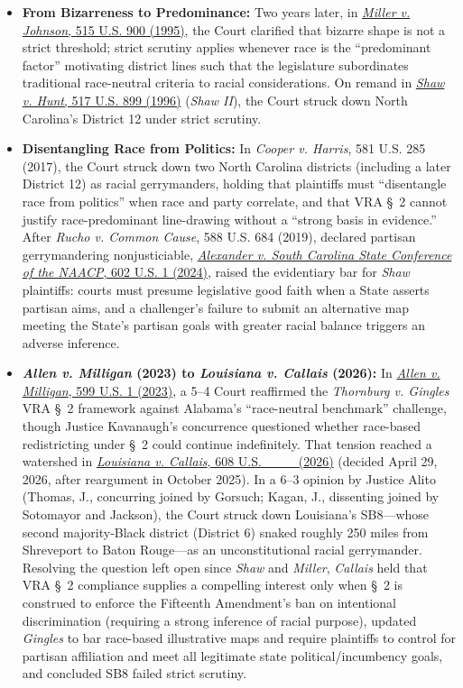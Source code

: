 \documentclass[12pt]{article}
\begin{document}
\begin{itemize}
  \item \textbf{From Bizarreness to Predominance:} Two years later, in \href{https://supreme.justia.com/cases/federal/us/515/900/}{\textit{Miller v. Johnson}, 515 U.S. 900 (1995)}, the Court clarified that bizarre shape is not a strict threshold; strict scrutiny applies whenever race is the ``predominant factor'' motivating district lines such that the legislature subordinates traditional race-neutral criteria to racial considerations. On remand in \href{https://supreme.justia.com/cases/federal/us/517/899/}{\textit{Shaw v. Hunt}, 517 U.S. 899 (1996)} (\textit{Shaw II}), the Court struck down North Carolina's District 12 under strict scrutiny.
  \item \textbf{Disentangling Race from Politics:} In \textit{Cooper v. Harris}, 581 U.S. 285 (2017), the Court struck down two North Carolina districts (including a later District 12) as racial gerrymanders, holding that plaintiffs must ``disentangle race from politics'' when race and party correlate, and that VRA \S~2 cannot justify race-predominant line-drawing without a ``strong basis in evidence.'' After \textit{Rucho v. Common Cause}, 588 U.S. 684 (2019), declared partisan gerrymandering nonjusticiable, \href{https://supreme.justia.com/cases/federal/us/602/22-807/}{\textit{Alexander v. South Carolina State Conference of the NAACP}, 602 U.S. 1 (2024)}, raised the evidentiary bar for \textit{Shaw} plaintiffs: courts must presume legislative good faith when a State asserts partisan aims, and a challenger's failure to submit an alternative map meeting the State's partisan goals with greater racial balance triggers an adverse inference.
  \item \textbf{\textit{Allen v. Milligan} (2023) to \textit{Louisiana v. Callais} (2026):} In \href{https://supreme.justia.com/cases/federal/us/599/21-1086/}{\textit{Allen v. Milligan}, 599 U.S. 1 (2023)}, a 5--4 Court reaffirmed the \textit{Thornburg v. Gingles} VRA \S~2 framework against Alabama's ``race-neutral benchmark'' challenge, though Justice Kavanaugh's concurrence questioned whether race-based redistricting under \S~2 could continue indefinitely. That tension reached a watershed in \href{https://supreme.justia.com/cases/federal/us/608/24-109/}{\textit{Louisiana v. Callais}, 608 U.S. \_\_\_ (2026)} (decided April 29, 2026, after reargument in October 2025). In a 6--3 opinion by Justice Alito (Thomas, J., concurring joined by Gorsuch; Kagan, J., dissenting joined by Sotomayor and Jackson), the Court struck down Louisiana's SB8---whose second majority-Black district (District 6) snaked roughly 250 miles from Shreveport to Baton Rouge---as an unconstitutional racial gerrymander. Resolving the question left open since \textit{Shaw} and \textit{Miller}, \textit{Callais} held that VRA \S~2 compliance supplies a compelling interest only when \S~2 is construed to enforce the Fifteenth Amendment's ban on intentional discrimination (requiring a strong inference of racial purpose), updated \textit{Gingles} to bar race-based illustrative maps and require plaintiffs to control for partisan affiliation and meet all legitimate state political/incumbency goals, and concluded SB8 failed strict scrutiny.
\end{itemize}
\end{document}
